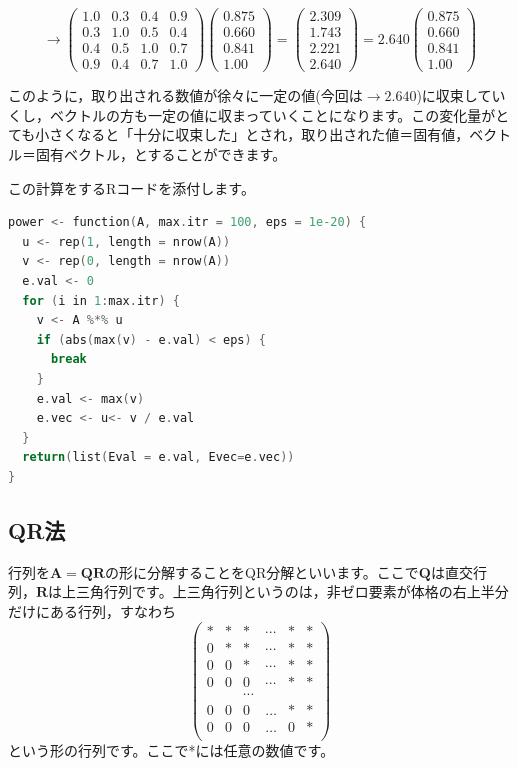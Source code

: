 \documentclass{ltjsbook}
\begin{document}
$$\to\left( \begin{array}{cccc} 1.0 & 0.3 & 0.4 & 0.9\\ 0.3 & 1.0 & 0.5 & 0.4\\  0.4 & 0.5 & 1.0 & 0.7\\ 0.9 & 0.4 & 0.7 & 1.0 \end{array} \right) \left( \begin{array}{c} 0.875\\ 0.660\\ 0.841\\ 1.00 \end{array} \right)=\left( \begin{array}{c} 2.309\\ 1.743\\ 2.221\\ 2.640 \end{array} \right)=2.640\left( \begin{array}{c} 0.875\\ 0.660\\ 0.841\\ 1.00 \end{array} \right)$$

このように，取り出される数値が徐々に一定の値(今回は$\to2.640$)に収束していくし，ベクトルの方も一定の値に収まっていくことになります。この変化量がとても小さくなると「十分に収束した」とされ，取り出された値＝固有値，ベクトル＝固有ベクトル，とすることができます。

この計算をするRコードを添付します。
\begin{lstlisting}[language=C++,label={Power},caption={パワー法による最大固有値の算出関数}]
power <- function(A, max.itr = 100, eps = 1e-20) {
  u <- rep(1, length = nrow(A))
  v <- rep(0, length = nrow(A))
  e.val <- 0
  for (i in 1:max.itr) {
    v <- A %*% u
    if (abs(max(v) - e.val) < eps) {
      break
    }
    e.val <- max(v)
    e.vec <- u<- v / e.val
  }
  return(list(Eval = e.val, Evec=e.vec))
}
\end{lstlisting}

\subsection{QR法}
行列を$\bm{A}=\bm{QR}$の形に分解することをQR分解といいます。ここで$\bm{Q}$は直交行列，$\bm{R}$は上三角行列です。上三角行列というのは，非ゼロ要素が体格の右上半分だけにある行列，すなわち
\[
	\begin{pmatrix}
		* & * & *      & \cdots & * & * \\
		0 & * & *      & \cdots & * & * \\
		0 & 0 & *      & \cdots & * & * \\
		0 & 0 & 0      & \cdots & * & * \\
		  &   & \cdots &        &       \\
		0 & 0 & 0      & \dots  & * & * \\
		0 & 0 & 0      & \dots  & 0 & * \\
	\end{pmatrix}
\]
という形の行列です。ここで*には任意の数値です。
\end{document}
